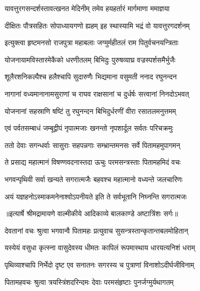 \addtocounter{shlokacount}{1}

\twolineshloka
{यावत्तुरगसन्दर्शस्तावत्खनत मेदिनीम्}
{तमेव हयहर्तारं मार्गमाणा ममाज्ञया} %

\twolineshloka
{दीक्षितः पौत्रसहितः सोपाध्यायगणो ह्यहम्}
{इह स्थास्यामि भद्रं वो यावत्तुरगदर्शनम्} %

\twolineshloka
{इत्युक्त्वा हृष्टमनसो राजपुत्रा महाबलाः}
{जग्मुर्महीतलं राम पितुर्वचनयन्त्रिताः} %

\twolineshloka
{योजनायामविस्तारमेकैको धरणीतलम्}
{बिभिदुः पुरुषव्याघ्र वज्रस्पर्शसमैर्भुजैः} %

\twolineshloka
{शूलैरशनिकल्पैश्च हलैश्चापि सुदारुणैः}
{भिद्यमाना वसुमती ननाद रघुनन्दन} %

\twolineshloka
{नागानां वध्यमानानामसुराणां च राघव}
{राक्षसानां च दुर्धर्षः सत्त्वानां निनदोऽभवत्} %

\twolineshloka
{योजनानां सहस्राणि षष्टिं तु रघुनन्दन}
{बिभिदुर्धरणीं वीरा रसातलमनुत्तमम्} %

\twolineshloka
{एवं पर्वतसम्बाधं जम्बूद्वीपं नृपात्मजाः}
{खनन्तो नृपशार्दूल सर्वतः परिचक्रमुः} %

\twolineshloka
{ततो देवाः सगन्धर्वाः सासुराः सहपन्नगाः}
{सम्भ्रान्तमनसः सर्वे पितामहमुपागमन्} %

\twolineshloka
{ते प्रसाद्य महात्मानं विषण्णवदनास्तदा}
{ऊचुः परमसन्त्रस्ताः पितामहमिदं वचः} %

\twolineshloka
{भगवन्पृथिवी सर्वा खन्यते सगरात्मजैः}
{बहवश्च महात्मानो वध्यन्ते जलचारिणः} %

\twolineshloka
{अयं यज्ञहनोऽस्माकमनेनाश्वोऽपनीयते}
{इति ते सर्वभूतानि निघ्नन्ति सगरात्मजः} %


{॥इत्यार्षे श्रीमद्रामायणे वाल्मीकीये आदिकाव्ये बालकाण्डे अष्टात्रिंशः सर्गः॥}


\twolineshloka
{देवतानां वचः श्रुत्वा भगवान्वै पितामहः}
{प्रत्युवाच सुसन्त्रस्तान्कृतान्तबलमोहितान्} %

\twolineshloka
{यस्येयं वसुधा कृत्स्ना वासुदेवस्य धीमतः}
{कापिलं रूपमास्थाय धारयत्यनिशं धराम्} %

\twolineshloka
{पृथिव्याश्चापि निर्भेदो दृष्ट एव सनातनः}
{सगरस्य च पुत्राणां विनाशोऽदीर्घजीविनाम्} %

\twolineshloka
{पितामहवचः श्रुत्वा त्रयस्त्रिंशदरिन्दमः}
{देवाः परमसंहृष्टाः पुनर्जग्मुर्यथागतम्} %

